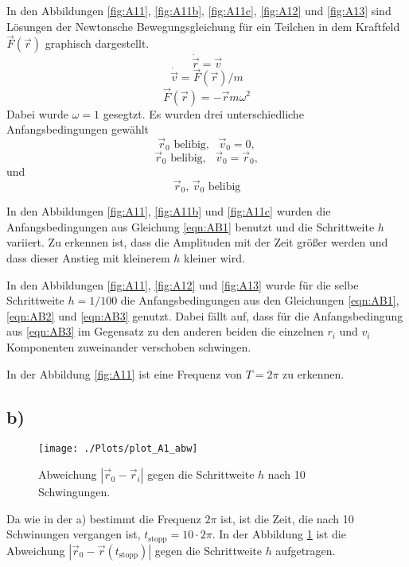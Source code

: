     In den Abbildungen \ref{fig:A11}, \ref{fig:A11b}, \ref{fig:A11c}, \ref{fig:A12} und \ref{fig:A13} sind Lösungen der
    Newtonsche Bewegungsgleichung für ein Teilchen in dem Kraftfeld $\vec{F}(\vec{r})$ graphisch
    dargestellt.
    \begin{equation}
      \dot{\vec{r}} = \vec{v}
    \end{equation}
    \begin{equation}
      \dot{\vec{v}}= \vec{F}(\vec{r})/m
    \end{equation}
    \begin{equation}
      \vec{F}(\vec{r}) = - \vec{r} m \omega^2
    \end{equation}
    Dabei wurde $\omega=1$ gesegtzt.
    Es wurden drei unterschiedliche Anfangsbedingungen gewählt
    \begin{equation}
      \vec{r}_0 \text{ belibig},\,\,\,\, \vec{v}_0=0,
      \label{eqn:AB1}
    \end{equation}
    \begin{equation}
      \vec{r}_0\text{ belibig},\,\,\,\,  \vec{v}_0= \vec{r}_0,
      \label{eqn:AB2}
    \end{equation}
    und
    \begin{equation}
      \vec{r}_0,\, \vec{v}_0 \text{ belibig}
      \label{eqn:AB3}
    \end{equation}

    In den Abbildungen \ref{fig:A11}, \ref{fig:A11b} und \ref{fig:A11c} wurden
    die Anfangsbedingungen aus Gleichung \ref{eqn:AB1} benutzt und die Schrittweite $h$ variiert.
    Zu erkennen ist, dass die Amplituden mit der Zeit größer werden und dass dieser
    Anstieg mit kleinerem $h$ kleiner wird.

    In den Abbildungen \ref{fig:A11},  \ref{fig:A12} und \ref{fig:A13} wurde
    für die selbe Schrittweite $h=1/100$ die Anfangsbedingungen aus
    den Gleichungen \ref{eqn:AB1}, \ref{eqn:AB2} und \ref{eqn:AB3} genutzt.
    Dabei fällt auf, dass für die Anfangsbedingung aus \ref{eqn:AB3} im Gegensatz
    zu den anderen beiden die einzelnen $r_i$ und $v_i$ Komponenten zuweinander
    verschoben schwingen.

    In der Abbildung \ref{fig:A11} ist eine Frequenz von $T= 2\pi$ zu erkennen.


  \subsection*{b)}

    \begin{figure}
      \centering
      \texttt{[image: ./Plots/plot\_A1\_abw]}
      \caption{Abweichung $|\vec{r}_0 - \vec{r}_i|$ gegen die Schrittweite $h$ nach 10 Schwingungen.}
      \label{fig:A1abw}
    \end{figure}
    Da wie in der a) bestimmt die Frequenz $2\pi$ ist, ist die Zeit, die nach
    10 Schwinungen vergangen ist, $t_\text{stopp}=10\cdot2\pi$. In der Abbildung \ref{fig:A1abw}
    ist die Abweichung $|\vec{r}_0 - \vec{r}(t_\text{stopp})|$ gegen die Schrittweite $h$
    aufgetragen.

